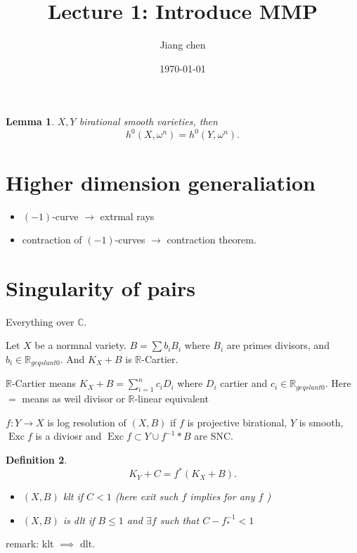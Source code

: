\documentclass{article}
\title{Lecture 1: Introduce MMP}
\author{Jiang chen}
\date{\today}
\newtheorem{defn}{Definition}[section]
\newtheorem{lem}[defn]{Lemma}
\begin{document}
  \maketitle

\begin{lem}
  $X ,Y$  birational smooth varieties, then 
  \[
    h^0(X,\omega ^n )=h^0(Y,\omega ^n)
  .\]
 
\end{lem}
\section{Higher dimension generaliation}
\begin{itemize}
  \item $(-1)$-curve $\to $ extrmal rays
  \item contraction of $(-1)$-curves  $\to $ contraction theorem.
\end{itemize}
\section{Singularity of pairs}
Everything over $\mathbb{C}$.

Let $X$ be a normnal variety. $B=\sum b_i B_{i}$ where $B_{i}$ are primes divisors, and $b_{i}\in \mathbb{R}_{geqslant 0}$. And $K_{X}+B$ is $\mathbb{R}$-Cartier. 

$\mathbb{R}$-Cartier means $K_{X}+B= \sum^{n}_{i=1} c_{i}D_{i}$ where $D_{i}$ cartier and $c_{i}\in \mathbb{R}_{geqslant 0}$. Here $=$ means as weil divisor or $\mathbb{R}$-linear equivalent

$f:Y\to X$ is log resolution of $(X,B)$ if $f$ is projective birational, $Y$ is smooth,$\operatorname{Exc}f$ is a diviosr and  $\operatorname{Exc}f \subset Y \cup  f^{-1}*B$ are SNC.     

\begin{defn}
  \[
    K_{Y}+C=f^*(K_{X}+B)
  .\]
 \begin{itemize}
   \item $(X,B)$ klt  if $C<1$  (here exit such $f$ implies for any $f$  )
   \item $(X,B)$ is dlt if $B\leqslant 1$ and $\exists f$ such that $C-f^{-1}_*<1$ 

 \end{itemize} 
\end{defn}
remark: klt $\implies$ dlt.
\end{document}
